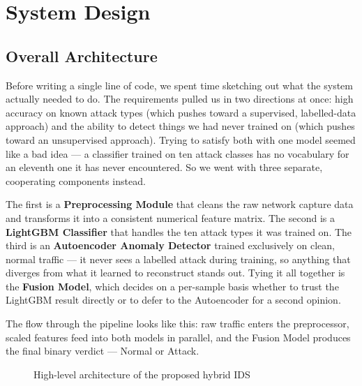 \documentclass[12pt,a4paper]{report}
\begin{document}
\chapter{System Design}

\section{Overall Architecture}

Before writing a single line of code, we spent time sketching out what the
system actually needed to do. The requirements pulled us in two directions at
once: high accuracy on known attack types (which pushes toward a supervised,
labelled-data approach) and the ability to detect things we had never trained on
(which pushes toward an unsupervised approach). Trying to satisfy both with one
model seemed like a bad idea — a classifier trained on ten attack classes has no
vocabulary for an eleventh one it has never encountered. So we went with three
separate, cooperating components instead.

\noindent The first is a \textbf{Preprocessing Module} that cleans the raw
network capture data and transforms it into a consistent numerical feature matrix.
The second is a \textbf{LightGBM Classifier} that handles the ten attack types it
was trained on. The third is an \textbf{Autoencoder Anomaly Detector} trained
exclusively on clean, normal traffic — it never sees a labelled attack during
training, so anything that diverges from what it learned to reconstruct stands out.
Tying it all together is the \textbf{Fusion Model}, which decides on a per-sample
basis whether to trust the LightGBM result directly or to defer to the Autoencoder
for a second opinion.

\noindent The flow through the pipeline looks like this: raw traffic enters the
preprocessor, scaled features feed into both models in parallel, and the Fusion
Model produces the final binary verdict — Normal or Attack.

\begin{figure}[H]
  \centering
  \caption{High-level architecture of the proposed hybrid IDS}
  \label{fig:architecture}
\end{figure}
\end{document}
